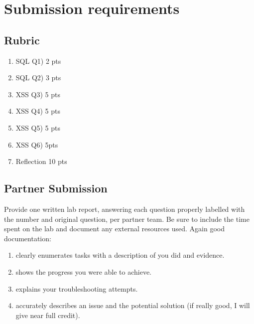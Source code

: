 \documentclass{article}
\begin{document}

\section{Submission requirements}

\subsection{Rubric}
\begin{enumerate}
\item SQL Q1) 2 pts
\item SQL Q2) 3 pts
\item XSS Q3) 5 pts
\item XSS Q4) 5 pts
\item XSS Q5) 5 pts 
\item XSS Q6) 5pts 
\item Reflection 10 pts 
\end{enumerate}


\subsection{Partner Submission}
Provide one written lab report, answering each question properly labelled with the number and original question, per partner team. Be sure to include the time spent on the lab and document any external resources used. 
Again good documentation: 
\begin{enumerate}
\item clearly enumerates tasks with a description of you did and evidence.  
\item shows the progress you were able to achieve.
\item explains your troubleshooting attempts.
\item accurately describes an issue and the potential solution (if really good, I will give near full credit).
\end{enumerate}
\end{document}
